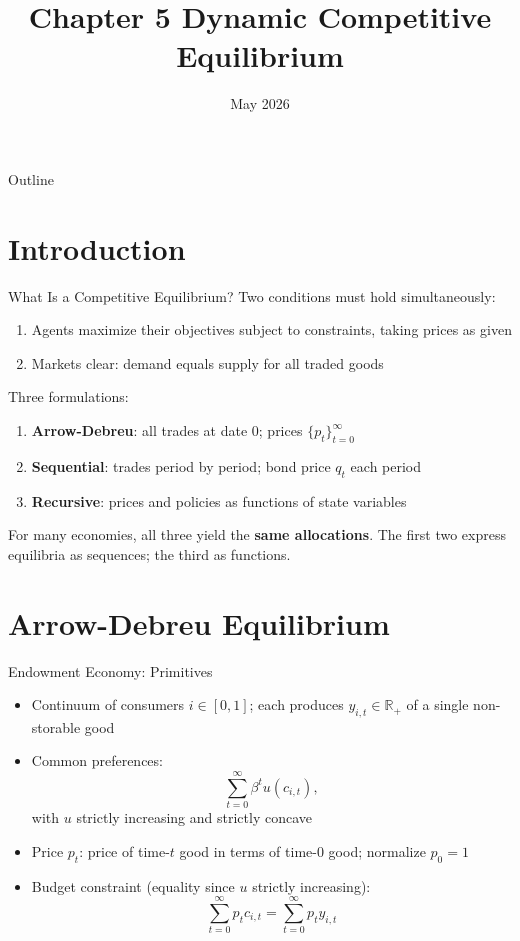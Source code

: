 \documentclass[blue]{beamer}
\title[Chapter5]{Chapter 5 Dynamic Competitive Equilibrium}
\author[]{}
\date[May 2026]{May 2026}
\begin{document}
  \frame
  {
    \titlepage
  }


\begin{frame}{Outline}
	\tableofcontents
\end{frame}


\section{Introduction}

\begin{frame}{What Is a Competitive Equilibrium?}
	Two conditions must hold simultaneously:
	\begin{enumerate}
		\item Agents maximize their objectives subject to constraints, taking prices as given
		\item Markets clear: demand equals supply for all traded goods
	\end{enumerate}
	
	\bigskip
	Three formulations:
	\begin{enumerate}
		\item \textbf{Arrow-Debreu}: all trades at date 0; prices $\{p_t\}_{t=0}^{\infty}$
		\item \textbf{Sequential}: trades period by period; bond price $q_t$ each period
		\item \textbf{Recursive}: prices and policies as functions of state variables
	\end{enumerate}
	
	\bigskip
	For many economies, all three yield the \textbf{same allocations}. The first two express equilibria as sequences; the third as functions.
\end{frame}

\section{Arrow-Debreu Equilibrium}

\begin{frame}{Endowment Economy: Primitives}
	\begin{itemize}
		\item Continuum of consumers $i \in [0,1]$; each produces $y_{i,t} \in \mathbb{R}_+$ of a single non-storable good
		\item Common preferences: 
		$$
		\sum_{t=0}^{\infty} \beta^t u(c_{i,t}),
		$$
		with $u$ strictly increasing and strictly concave
		\item Price $p_t$: price of time-$t$ good in terms of time-0 good; normalize $p_0 = 1$
		\item Budget constraint (equality since $u$ strictly increasing):
		\[
		\sum_{t=0}^{\infty} p_t c_{i,t} = \sum_{t=0}^{\infty} p_t y_{i,t}
		\]
	\end{itemize}
\end{frame}
\end{document}
